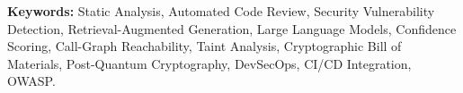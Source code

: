 \vspace{0.8cm}

\noindent\textbf{Keywords:} Static Analysis, Automated Code Review, Security Vulnerability Detection, Retrieval-Augmented Generation, Large Language Models, Confidence Scoring, Call-Graph Reachability, Taint Analysis, Cryptographic Bill of Materials, Post-Quantum Cryptography, DevSecOps, CI/CD Integration, OWASP.

\clearpage

